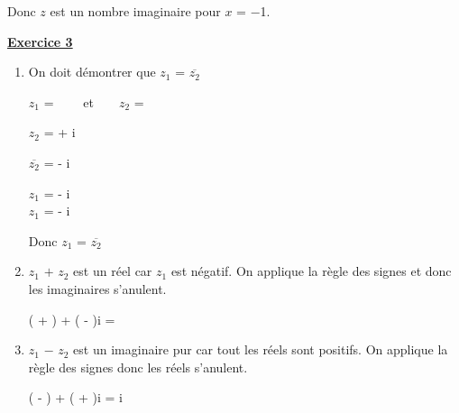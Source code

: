\documentclass[12pt, a4paper, french]{article}
\begin{document}
\begin{Exo}
\begin{enumerate}
			Donc $z$ est un nombre imaginaire pour $x$ = $-$1.	
	\end{enumerate}	
\item \underline{\textbf{Exercice 3}}
	\begin{enumerate}\par
		\item On doit d\'emontrer que $z_1$ = $\overline{z_2}$
			\begin{flushleft}
				$z_1$ = ~~~~et~~~~$z_2$ = \par
				$z_2$ =  \Leftrightarrow {} \Leftrightarrow {} \Leftrightarrow {} \Leftrightarrow {} + i \par
			$\overline{z_2}$ =  - i 
			\end{flushleft}

			\begin{flushleft}
				$z_1$ =  \Leftrightarrow {} \Leftrightarrow {} \Leftrightarrow {} \Leftrightarrow {} - \dfrac {13}{37}i \\

			$z_1$ =  - \dfrac {13}{37}i \par
			\end{flushleft}
            Donc $z_1$ = $\overline{z_2}$

		\item $z_1$ $+$ $z_2$ est un r\'eel car $z_1$ est n\'egatif. On applique la r\`egle des signes et donc les imaginaires s'anulent.
			\begin{flushleft}
				\left ( \dfrac{4}{37} +  \right ) + \left (  -  \right )i = \dfrac{8}{37}
			\end{flushleft}
		
		\item $z_1$ $-$ $z_2$ est un imaginaire pur car tout les r\'eels sont positifs. On applique la r\`egle des signes donc les r\'eels s'anulent.
			\begin{flushleft}
				\left ( \dfrac{4}{37} -  \right ) + \left ( \dfrac{13}{37} +  \right )i = \dfrac{26}{37}i
			\end{flushleft}


	\end{enumerate}	
\end{Exo}
\end{document}
